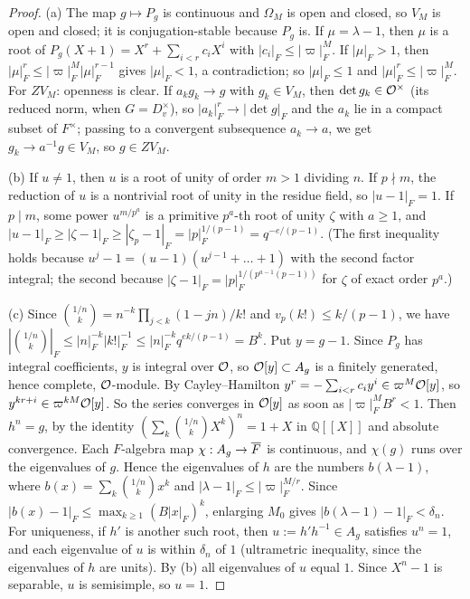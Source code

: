 \begin{proof}
(a) The map $g\mapsto P_g$ is continuous and $\Omega_M$ is open and closed, so $V_M$ is open and closed; it is conjugation-stable because $P_g$ is. If $\mu=\lambda-1$, then $\mu$ is a root of $P_g(X+1)=X^r+\sum_{i<r}c_iX^i$ with $|c_i|_F\le|\varpi|_F^M$. If $|\mu|_F>1$, then $|\mu|_F^r\le|\varpi|_F^M|\mu|_F^{r-1}$ gives $|\mu|_F<1$, a contradiction; so $|\mu|_F\le1$ and $|\mu|_F^r\le|\varpi|_F^M$. For $ZV_M$: openness is clear. If $a_kg_k\to g$ with $g_k\in V_M$, then $\det g_k\in\mathcal{O}^\times$ (its reduced norm, when $G=D_v^\times$), so $|a_k|_F^r\to|\det g|_F$ and the $a_k$ lie in a compact subset of $F^\times$; passing to a convergent subsequence $a_k\to a$, we get $g_k\to a^{-1}g\in V_M$, so $g\in ZV_M$.

(b) If $u\ne1$, then $u$ is a root of unity of order $m>1$ dividing $n$. If $p\nmid m$, the reduction of $u$ is a nontrivial root of unity in the residue field, so $|u-1|_F=1$. If $p\mid m$, some power $u^{m/p^a}$ is a primitive $p^a$-th root of unity $\zeta$ with $a\ge1$, and $|u-1|_F\ge|\zeta-1|_F\ge|\zeta_p-1|_F=|p|_F^{1/(p-1)}=q^{-e/(p-1)}$. (The first inequality holds because $u^j-1=(u-1)(u^{j-1}+\dots+1)$ with the second factor integral; the second because $|\zeta-1|_F=|p|_F^{1/(p^{a-1}(p-1))}$ for $\zeta$ of exact order $p^a$.)

(c) Since $\binom{1/n}{k}=n^{-k}\prod_{j<k}(1-jn)/k!$ and $v_p(k!)\le k/(p-1)$, we have $|\binom{1/n}{k}|_F\le|n|_F^{-k}|k!|_F^{-1}\le|n|_F^{-k}q^{ek/(p-1)}=B^k$. Put $y=g-1$. Since $P_g$ has integral coefficients, $y$ is integral over $\mathcal{O}$, so $\mathcal{O}[y]\subset A_g$ is a finitely generated, hence complete, $\mathcal{O}$-module. By Cayley--Hamilton $y^r=-\sum_{i<r}c_iy^i\in\varpi^M\mathcal{O}[y]$, so $y^{kr+i}\in\varpi^{kM}\mathcal{O}[y]$. So the series converges in $\mathcal{O}[y]$ as soon as $|\varpi|_F^MB^r<1$. Then $h^n=g$, by the identity $(\sum_k\binom{1/n}{k}X^k)^n=1+X$ in $\mathbb Q[[X]]$ and absolute convergence. Each $F$-algebra map $\chi:A_g\to\overline{F}$ is continuous, and $\chi(g)$ runs over the eigenvalues of $g$. Hence the eigenvalues of $h$ are the numbers $b(\lambda-1)$, where $b(x)=\sum_k\binom{1/n}{k}x^k$ and $|\lambda-1|_F\le|\varpi|_F^{M/r}$. Since $|b(x)-1|_F\le\max_{k\ge1}(B|x|_F)^k$, enlarging $M_0$ gives $|b(\lambda-1)-1|_F<\delta_n$. For uniqueness, if $h'$ is another such root, then $u:=h'h^{-1}\in A_g$ satisfies $u^n=1$, and each eigenvalue of $u$ is within $\delta_n$ of $1$ (ultrametric inequality, since the eigenvalues of $h$ are units). By (b) all eigenvalues of $u$ equal $1$. Since $X^n-1$ is separable, $u$ is semisimple, so $u=1$.


\end{proof}

